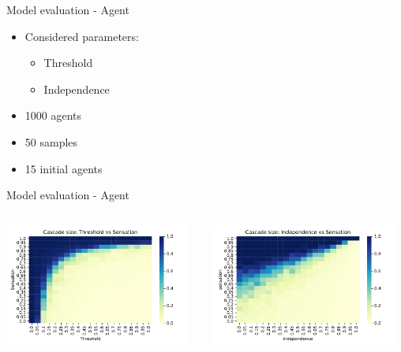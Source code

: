 \documentclass{beamer}
\begin{document}
\begin{frame}{Model evaluation - Agent}
    \begin{itemize}
        \item Considered parameters:
        \begin{itemize}
            \item Threshold
            \item Independence
        \end{itemize}
        \item 1000 agents
        \item 50 samples
        \item 15 initial agents
    \end{itemize}
\end{frame}

\begin{frame}{Model evaluation - Agent}
    \begin{columns}
        \begin{column}{0.5\textwidth}
            \centering
            \includegraphics[width=0.95\textwidth]{images/threshold_sensation.pdf}
        \end{column}
        \begin{column}{0.5\textwidth}
            \centering
            \includegraphics[width=0.95\textwidth]{images/independence_sensation.pdf}
        \end{column}
    \end{columns}
\end{frame}
\end{document}
